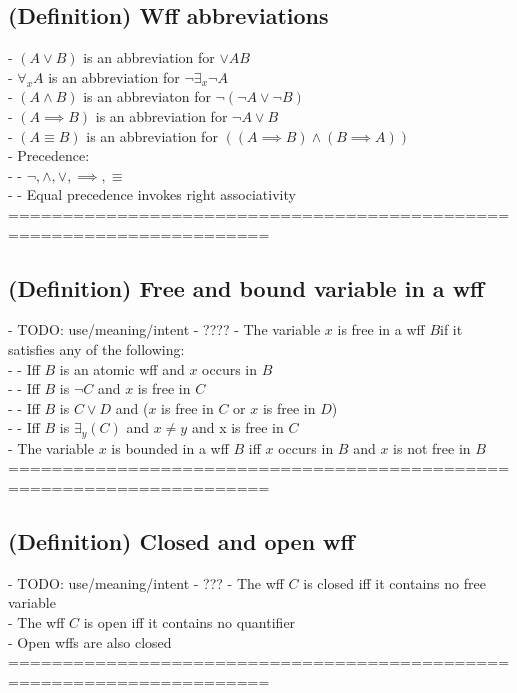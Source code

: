 \documentclass{article}
\begin{document}
\subsection{(Definition) Wff abbreviations}
	- $(A \lor B)$ is an abbreviation for $\lor A B$ \\
	- $\forall_x A$ is an abbreviation for $\lnot \exists_x \lnot A$  \\
	- $(A \land B)$ is an abbreviaton for $\lnot (\lnot A \lor \lnot B)$ \\
	- $(A \implies B)$ is an abbreviation for $\lnot A \lor B$ \\
	- $(A \equiv B)$ is an abbreviation for $((A \implies B) \land (B \implies A))$ \\
	- Precedence: \\
		- - $\lnot, \land, \lor, \implies, \equiv$ \\
		- - Equal precedence invokes right associativity \\
	======================================================================
\subsection{(Definition) Free and bound variable in a wff}
	- TODO: use/meaning/intent - ????
	- The variable $x$ is free in a wff $B$if it satisfies any of the following: \\
		- - Iff $B$ is an atomic wff and $x$ occurs in $B$ \\
		- - Iff $B$ is $\lnot C$ and $x$ is free in $C$ \\
		- - Iff $B$ is $C \lor D$ and ($x$ is free in $C$ or $x$ is free in $D$) \\
		- - Iff $B$ is $\exists_y(C)$ and $x \neq y$ and x is free in $C$ \\
	- The variable $x$ is bounded in a wff $B$ iff $x$ occurs in $B$ and $x$ is not free in $B$ \\
	======================================================================
\subsection{(Definition) Closed and open wff}
	- TODO: use/meaning/intent - ???
	- The wff $C$ is closed iff it contains no free variable \\
	- The wff $C$ is open iff it contains no quantifier \\
		- Open wffs are also closed \\
	======================================================================
\end{document}
